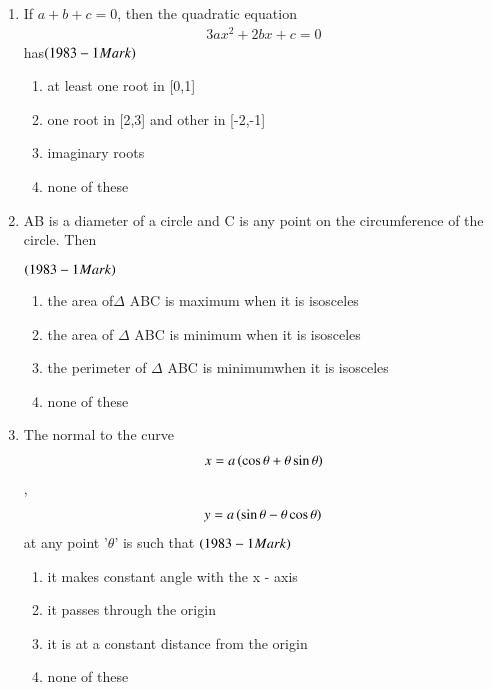 \documentclass[journal,12pt,twocolumn]{IEEEtran}
\theoremstyle{remark}
\begin{document}
\begin{enumerate}

        \item If $a+b+c = 0$, then the quadratic equation 
		\begin{align*}3ax^2 + 2bx + c = 0\end{align*} has\hfill$\left(1983 - 1 Mark\right)$

\begin{enumerate}
	\item at least one root in [0,1]
	\item one root in [2,3] and other in [-2,-1]
        \item imaginary roots
	\item none of these\\
\end{enumerate}

         \item AB is a diameter of a circle and C is any point on the
circumference of the circle. Then 

		\hfill$\left(1983 - 1 Mark\right)$

\begin{enumerate}
	\item the area of$\Delta$ ABC is maximum when it is isosceles
	\item the area of $\Delta$ ABC is minimum when it is isosceles
	\item the perimeter of $\Delta$ ABC is minimumwhen it is isosceles
	\item none of these\\
\end{enumerate}

         \item The normal to the curve 
\begin{align*}x = a\left(\cos \theta + \theta\sin \theta\right)\end{align*},
\begin{align*}y = a\left(\sin \theta - \theta\cos \theta\right)\end{align*}at 
any point '$\theta$' is such that \hfill$\left(1983 - 1 Mark\right)$

\begin{enumerate}
	\item it makes  constant angle with the x - axis
	\item it passes through the origin
	\item it is at a constant distance from the origin
	\item none of these\\
\end{enumerate}


\end{enumerate}
\end{document}
